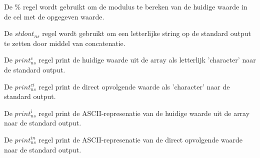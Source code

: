 \documentclass[11pt]{article}
\begin{document}
De \% regel wordt gebruikt om de modulus te bereken van de huidige waarde in de cel met de opgegeven waarde.
\begin{prooftree}
\end{prooftree}

\begin{prooftree}
\end{prooftree}



De $stdout_{ns}$ regel wordt gebruikt om een letterlijke string op de standard output te zetten door middel van concatenatie.
\begin{prooftree}
\end{prooftree}


De $print^c_{ns}$ regel print de huidige waarde uit de array als letterlijk 'character' naar de standard output.
\begin{prooftree}
\end{prooftree}

De $print^{ci}_{ns}$ regel print de direct opvolgende waarde als 'character' naar de standard output.
\begin{prooftree}
\end{prooftree}

De $print^i_{ns}$ regel print de ASCII-represenatie van de huidige waarde uit de array naar de standard output.
\begin{prooftree}
\end{prooftree}

De $print^{in}_{ns}$ regel print de ASCII-represenatie van de direct opvolgende waarde naar de standard output.
\begin{prooftree}
\end{prooftree}
\end{document}
